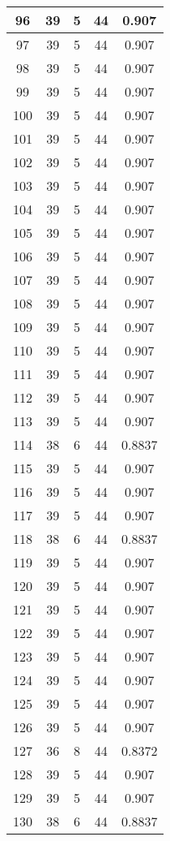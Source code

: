 \documentclass[letterpaper, 12pt]{article}
\begin{document}
\begin{longtable}{|c|c|c|c|c|}
\hline
96 & 39 & 5 & 44 & 0.907 \\
\hline
97 & 39 & 5 & 44 & 0.907 \\
\hline
98 & 39 & 5 & 44 & 0.907 \\
\hline
99 & 39 & 5 & 44 & 0.907 \\
\hline
100 & 39 & 5 & 44 & 0.907 \\
\hline
101 & 39 & 5 & 44 & 0.907 \\
\hline
102 & 39 & 5 & 44 & 0.907 \\
\hline
103 & 39 & 5 & 44 & 0.907 \\
\hline
104 & 39 & 5 & 44 & 0.907 \\
\hline
105 & 39 & 5 & 44 & 0.907 \\
\hline
106 & 39 & 5 & 44 & 0.907 \\
\hline
107 & 39 & 5 & 44 & 0.907 \\
\hline
108 & 39 & 5 & 44 & 0.907 \\
\hline
109 & 39 & 5 & 44 & 0.907 \\
\hline
110 & 39 & 5 & 44 & 0.907 \\
\hline
111 & 39 & 5 & 44 & 0.907 \\
\hline
112 & 39 & 5 & 44 & 0.907 \\
\hline
113 & 39 & 5 & 44 & 0.907 \\
\hline
114 & 38 & 6 & 44 & 0.8837 \\
\hline
115 & 39 & 5 & 44 & 0.907 \\
\hline
116 & 39 & 5 & 44 & 0.907 \\
\hline
117 & 39 & 5 & 44 & 0.907 \\
\hline
118 & 38 & 6 & 44 & 0.8837 \\
\hline
119 & 39 & 5 & 44 & 0.907 \\
\hline
120 & 39 & 5 & 44 & 0.907 \\
\hline
121 & 39 & 5 & 44 & 0.907 \\
\hline
122 & 39 & 5 & 44 & 0.907 \\
\hline
123 & 39 & 5 & 44 & 0.907 \\
\hline
124 & 39 & 5 & 44 & 0.907 \\
\hline
125 & 39 & 5 & 44 & 0.907 \\
\hline
126 & 39 & 5 & 44 & 0.907 \\
\hline
127 & 36 & 8 & 44 & 0.8372 \\
\hline
128 & 39 & 5 & 44 & 0.907 \\
\hline
129 & 39 & 5 & 44 & 0.907 \\
\hline
130 & 38 & 6 & 44 & 0.8837 \\

\end{longtable}
\end{document}
